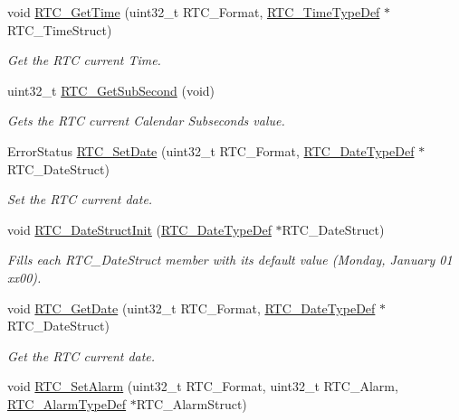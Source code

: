 \begin{DoxyCompactItemize}
void \hyperlink{group___r_t_c_ga1fcc101339c77aebd25ec3621fd1b61a}{R\-T\-C\-\_\-\-Get\-Time} (uint32\-\_\-t R\-T\-C\-\_\-\-Format, \hyperlink{struct_r_t_c___time_type_def}{R\-T\-C\-\_\-\-Time\-Type\-Def} $\ast$R\-T\-C\-\_\-\-Time\-Struct)
\begin{DoxyCompactList}\small\item\em Get the R\-T\-C current Time. \end{DoxyCompactList}\item 
uint32\-\_\-t \hyperlink{group___r_t_c_gae59c33fb19e36b6abab0bad58072c01a}{R\-T\-C\-\_\-\-Get\-Sub\-Second} (void)
\begin{DoxyCompactList}\small\item\em Gets the R\-T\-C current Calendar Subseconds value. \end{DoxyCompactList}\item 
Error\-Status \hyperlink{group___r_t_c_ga69d08538147f3d89c818dcfabf50e362}{R\-T\-C\-\_\-\-Set\-Date} (uint32\-\_\-t R\-T\-C\-\_\-\-Format, \hyperlink{struct_r_t_c___date_type_def}{R\-T\-C\-\_\-\-Date\-Type\-Def} $\ast$R\-T\-C\-\_\-\-Date\-Struct)
\begin{DoxyCompactList}\small\item\em Set the R\-T\-C current date. \end{DoxyCompactList}\item 
void \hyperlink{group___r_t_c_ga6e4e99be910d7759f8910056a2985056}{R\-T\-C\-\_\-\-Date\-Struct\-Init} (\hyperlink{struct_r_t_c___date_type_def}{R\-T\-C\-\_\-\-Date\-Type\-Def} $\ast$R\-T\-C\-\_\-\-Date\-Struct)
\begin{DoxyCompactList}\small\item\em Fills each R\-T\-C\-\_\-\-Date\-Struct member with its default value (Monday, January 01 xx00). \end{DoxyCompactList}\item 
void \hyperlink{group___r_t_c_ga582645d554cdd4a316213e90f0b4c8ae}{R\-T\-C\-\_\-\-Get\-Date} (uint32\-\_\-t R\-T\-C\-\_\-\-Format, \hyperlink{struct_r_t_c___date_type_def}{R\-T\-C\-\_\-\-Date\-Type\-Def} $\ast$R\-T\-C\-\_\-\-Date\-Struct)
\begin{DoxyCompactList}\small\item\em Get the R\-T\-C current date. \end{DoxyCompactList}\item 
void \hyperlink{group___r_t_c_ga44e3334f8e882df9b8a59b47f0857395}{R\-T\-C\-\_\-\-Set\-Alarm} (uint32\-\_\-t R\-T\-C\-\_\-\-Format, uint32\-\_\-t R\-T\-C\-\_\-\-Alarm, \hyperlink{struct_r_t_c___alarm_type_def}{R\-T\-C\-\_\-\-Alarm\-Type\-Def} $\ast$R\-T\-C\-\_\-\-Alarm\-Struct)

\end{DoxyCompactItemize}
